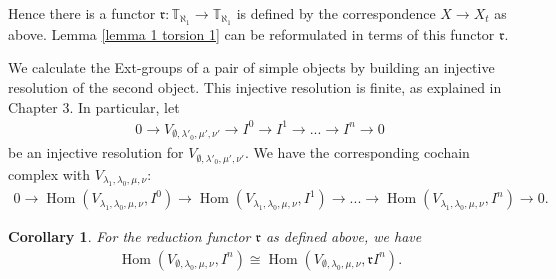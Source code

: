 \documentclass[openany, a4paper]{amsbook}
\newtheorem{cor}[thm]{Corollary}
\theoremstyle{definition}
\numberwithin{equation}{chapter}
\newcommand{\T}[1]{{\mathbb{T}}_{\aleph_{#1}}}
\DeclareMathOperator{\Hom}{\mathrm{Hom}}
\begin{document}
Hence there is a functor $\mathfrak{r}: \T{1} \to \T{1}$ is defined by the correspondence $X \to X_t$ as above. Lemma \ref{lemma 1 torsion 1} can be reformulated in terms of this functor $\mathfrak{r}$.

We calculate the Ext-groups of a pair of simple objects by building an injective resolution of the second object. This injective resolution is finite, as explained in Chapter 3. In particular, let 
\begin{align}\label{resolution_case1}
    0 \to V_{\emptyset, \lambda'_0, \mu', \nu'} \to I^0 \to I^1 \to ...\to I^n \to 0
\end{align}
be an injective resolution for $V_{\emptyset, \lambda'_0, \mu', \nu'}$. We have the corresponding cochain complex with $V_{\lambda_1, \lambda_0, \mu, \nu}$:
\begin{align}\label{cochain V}
    0 \to  \Hom (V_{\lambda_1, \lambda_0, \mu, \nu}, I^0) \to \Hom (V_{\lambda_1, \lambda_0, \mu, \nu}, I^1) \to ... \to \Hom (V_{\lambda_1, \lambda_0, \mu, \nu}, I^n) \to 0.
\end{align}



\begin{cor}\label{Hom RV}
    For the reduction functor $\mathfrak{r}$ as defined above, we have
    \begin{align*}
        \Hom(V_{\emptyset, \lambda_0, \mu, \nu}, I^n) \cong \Hom(V_{\emptyset, \lambda_0, \mu, \nu}, \mathfrak{r}I^n).
    \end{align*}
\end{cor}
\end{document}
